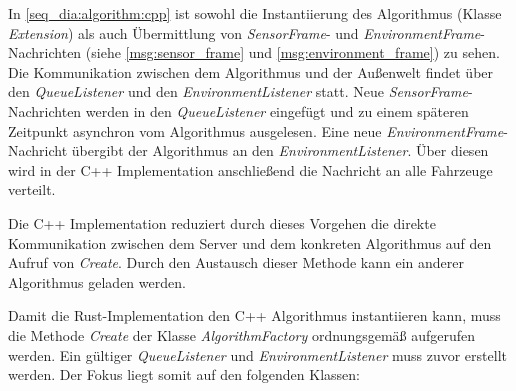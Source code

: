 In \autoref{seq_dia:algorithm:cpp} ist sowohl die Instantiierung des Algorithmus (Klasse \textit{Extension}) als auch Übermittlung von \textit{SensorFrame}- und \textit{EnvironmentFrame}-Nachrichten (siehe \autoref{msg:sensor_frame} und \autoref{msg:environment_frame}) zu sehen.
Die Kommunikation zwischen dem Algorithmus und der Außenwelt findet über den \textit{QueueListener} und den \textit{EnvironmentListener} statt.
Neue \textit{SensorFrame}-Nachrichten werden in den \textit{QueueListener} eingefügt und zu einem späteren Zeitpunkt asynchron vom Algorithmus ausgelesen.
Eine neue \textit{EnvironmentFrame}-Nachricht übergibt der Algorithmus an den \textit{EnvironmentListener}.
Über diesen wird in der C++ Implementation anschließend die Nachricht an alle Fahrzeuge verteilt.

Die C++ Implementation reduziert durch dieses Vorgehen die direkte Kommunikation zwischen dem Server und dem konkreten Algorithmus auf den Aufruf von \textit{Create}.
Durch den Austausch dieser Methode kann ein anderer Algorithmus geladen werden.

Damit die Rust-Implementation den C++ Algorithmus instantiieren kann, muss die Methode \textit{Create} der Klasse \textit{AlgorithmFactory} ordnungsgemäß aufgerufen werden.
Ein gültiger \textit{QueueListener} und \textit{EnvironmentListener} muss zuvor erstellt werden.
Der Fokus liegt somit auf den folgenden Klassen:

